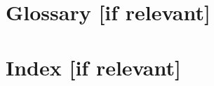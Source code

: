\documentclass[oneside]{../ecsprogress}    %
\begin{document}
\appendix

\clearpage
\backmatter
\chapter{Glossary [if relevant]}
\printbibliography[heading=bibintoc]
\chapter{Index [if relevant]}
\end{document}
